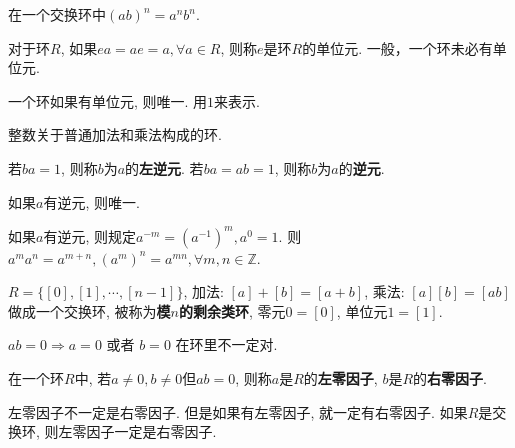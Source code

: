 \begin{Proposition}
在一个交换环中${(ab)}^n = a^n b^n$.
\end{Proposition}

\begin{Definition}[单位元]
对于环$R$, 如果$ea = ae = a, \forall a \in R$, 则称$e$是环$R$的单位元. 一般，一个环未必有单位元.
\end{Definition}

\begin{Proposition}
一个环如果有单位元, 则唯一. 用$\mathfrak{1}$来表示.
\end{Proposition}

\begin{Definition}[整数环]
整数关于普通加法和乘法构成的环.
\end{Definition}

\begin{Definition}[逆元]
若$ba = \mathfrak{1}$, 则称$b$为$a$的\textbf{左逆元}. 若$ba = ab = \mathfrak{1}$, 则称$b$为$a$的\textbf{逆元}. 
\end{Definition}

\begin{Proposition}
如果$a$有逆元, 则唯一.
\end{Proposition}

\begin{Proposition}
如果$a$有逆元, 则规定$a^{-m} = {(a^{-1})}^m, a^0 = \mathfrak{1}$. 则$a^m a^n = a^{m+n}, {(a^m)}^n = a^{mn}, \forall m, n \in \mathbb{Z}$.
\end{Proposition}

\begin{Proposition}[模$n$的剩余类环]
$R = \{ [0], [1], \cdots, [n-1] \}$, 加法: $[a] + [b] = [a+b]$, 乘法: $[a][b] = [ab]$做成一个交换环, 被称为\textbf{模$n$的剩余类环}, 零元$\mathfrak{0} = [0]$, 单位元$\mathfrak{1} = [1]$.
\end{Proposition}

\begin{Proposition}
$ab = \mathfrak{0} \Rightarrow a = \mathfrak{0} $ 或者 $b = \mathfrak{0}$ 在环里不一定对.
\end{Proposition}

\begin{Definition}[零因子]
在一个环$R$中, 若$a \neq \mathfrak{0}, b \neq \mathfrak{0}$但$ab = \mathfrak{0}$, 则称$a$是$R$的\textbf{左零因子}, $b$是$R$的\textbf{右零因子}.
\end{Definition}

\begin{Remark}
左零因子不一定是右零因子. 但是如果有左零因子, 就一定有右零因子. 如果$R$是交换环, 则左零因子一定是右零因子.
\end{Remark}

